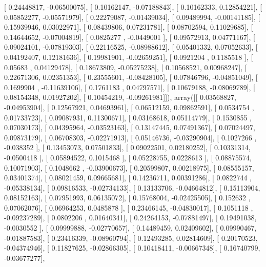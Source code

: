 \documentclass{article}
\begin{document}
       [ 0.24448817, -0.06500075],
       [ 0.10162147, -0.07188843],
       [ 0.10162333,  0.12854221],
       [ 0.05852277, -0.05571979],
       [ 0.22279087, -0.01439034],
       [ 0.09489994, -0.00141185],
       [ 0.15939946,  0.03022971],
       [ 0.08439806,  0.07231781],
       [ 0.08702594,  0.11029685],
       [ 0.14644652, -0.07004819],
       [ 0.0825277 , -0.0449001 ],
       [ 0.09572913,  0.04771167],
       [ 0.09024101, -0.07819303],
       [ 0.22116525, -0.08988612],
       [ 0.05401332,  0.07052633],
       [ 0.04192407,  0.12181636],
       [ 0.19981901, -0.02659251],
       [ 0.0921204 ,  0.1185518 ],
       [ 0.05683   ,  0.04129478],
       [ 0.18673809, -0.05275238],
       [ 0.10568521,  0.00968247],
       [ 0.22671306,  0.02351353],
       [ 0.23555601, -0.08428105],
       [ 0.07846796, -0.04851049],
       [ 0.1699904 , -0.11639106],
       [ 0.1761183 ,  0.04797571],
       [ 0.10679188, -0.08069789],
       [ 0.08154348,  0.01927202],
       [ 0.10454219, -0.09261981]]), array([[ 0.03568827, -0.04953904],
       [ 0.12567921,  0.04693961],
       [ 0.06512159,  0.09862591],
       [ 0.0534754 ,  0.01733723],
       [ 0.09087931,  0.11300671],
       [ 0.03168618,  0.05114779],
       [ 0.1530855 ,  0.07030173],
       [ 0.04395964, -0.03523163],
       [ 0.13147445,  0.07491367],
       [ 0.07024497,  0.09873179],
       [ 0.06708303, -0.02271913],
       [ 0.05146736, -0.03290904],
       [ 0.1027266 , -0.038352  ],
       [ 0.13453073,  0.07501833],
       [ 0.09022501,  0.02180252],
       [ 0.10331314, -0.0500418 ],
       [ 0.05894522,  0.1015468 ],
       [ 0.05228755,  0.0228613 ],
       [ 0.08875574,  0.10071903],
       [ 0.1048662 , -0.03900673],
       [ 0.20599807,  0.00218975],
       [ 0.08555157,  0.03401374],
       [ 0.08021459,  0.09665681],
       [ 0.14236711,  0.00391286],
       [ 0.0822744 , -0.05338134],
       [ 0.09816533, -0.02734133],
       [ 0.13133706, -0.04664812],
       [ 0.15113904,  0.08152163],
       [ 0.07951993,  0.06135072],
       [ 0.15768004, -0.02425505],
       [ 0.152632  ,  0.07062076],
       [ 0.06964253,  0.0485878 ],
       [ 0.23466145, -0.04830017],
       [ 0.1051118 , -0.09237289],
       [ 0.0802206 ,  0.01640341],
       [ 0.24264153, -0.07881497],
       [ 0.19491038, -0.0030552 ],
       [ 0.09999888, -0.02770657],
       [ 0.14489459,  0.02409602],
       [ 0.09990467, -0.01887583],
       [ 0.23416339, -0.08960794],
       [ 0.12493285,  0.02814609],
       [ 0.20170523, -0.04374946],
       [ 0.11827625, -0.02866305],
       [ 0.10418411, -0.00667348],
       [ 0.16740799, -0.03677277],
\end{document}
